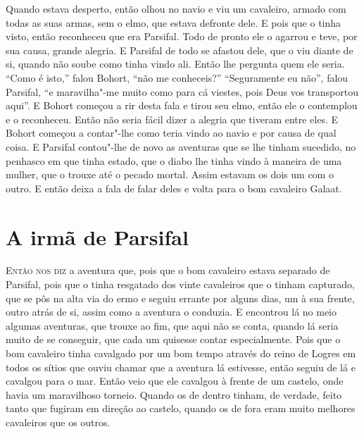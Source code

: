 Quando estava desperto, então olhou no navio e viu um cavaleiro, armado com
todas as suas armas, sem o elmo, que estava defronte dele. E pois que o tinha
visto, então reconheceu que era Parsifal. Todo de pronto ele o agarrou e teve,
por sua causa, grande alegria. E Parsifal de todo se afastou dele, que o viu
diante de si, quando não soube como tinha vindo ali. Então lhe pergunta quem
ele seria. “Como é isto,” falou Bohort, “não me conheceis?” “Seguramente eu
não”, falou Parsifal, “e maravilha"-me muito como para cá viestes, pois Deus
vos transportou aqui”. E Bohort começou a rir desta fala e tirou seu elmo,
então ele o contemplou e o reconheceu. Então não seria fácil dizer a alegria
que tiveram entre eles. E Bohort começou a contar"-lhe como teria vindo ao navio
e por causa de qual coisa. E Parsifal contou"-lhe de novo as aventuras que se
lhe tinham sucedido, no penhasco em que tinha estado, que o diabo lhe tinha
vindo à maneira de uma mulher, que o trouxe até o pecado mortal. Assim estavam
os dois um com o outro. E então deixa a fala de falar deles e volta para o bom
cavaleiro Galaat.

\chapter{A irmã de Parsifal}

E\textsc{ntão nos diz} a aventura que, pois que o bom cavaleiro estava separado de
Parsifal, pois que o tinha resgatado dos vinte cavaleiros que o tinham
capturado, que se pôs na alta via do ermo e seguiu errante por alguns dias, um
à sua frente, outro atrás de si, assim como a aventura o conduzia. E
encontrou lá no meio algumas aventuras, que trouxe ao fim, que aqui não se
conta, quando lá seria muito de se conseguir, que cada um quisesse contar
especialmente. Pois que o bom cavaleiro tinha cavalgado por um bom tempo
através do reino de Logres em todos os sítios que ouviu chamar que a aventura
lá estivesse, então seguiu de lá e cavalgou para o mar. Então veio que ele
cavalgou à frente de um castelo, onde havia um maravilhoso torneio. Quando os
de dentro tinham, de verdade, feito tanto que fugiram em direção ao castelo,
quando os de fora eram muito melhores cavaleiros que os outros. 

